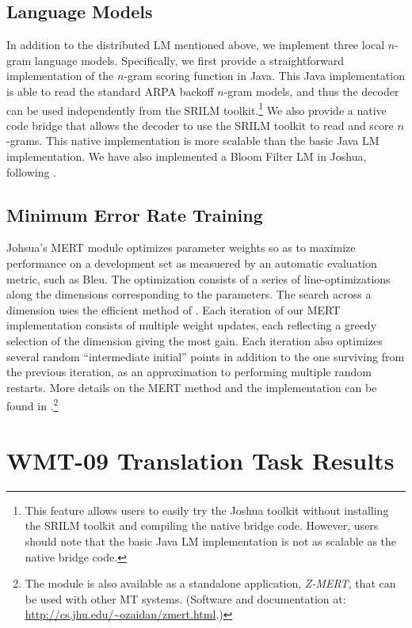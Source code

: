 \documentclass[11pt]{article}
\begin{document}
\subsection{Language Models}
In addition to the distributed LM mentioned above, we implement three local $n$-gram language models. Specifically, we first provide a straightforward implementation of the $n$-gram scoring function in Java. This Java implementation is able to read the standard ARPA backoff $n$-gram models, and thus the decoder can be used independently from the SRILM toolkit.\footnote{This feature allows users to easily try the Joshua toolkit without installing the SRILM toolkit and compiling the native bridge code. However, users should note that the basic Java LM implementation is not as scalable as the native bridge code.} We also provide a native code bridge that allows the decoder to use the SRILM toolkit to read and score $n$-grams. This native implementation is more scalable than the basic Java LM implementation. We have also implemented a Bloom Filter LM in Joshua, following .

\subsection{Minimum Error Rate Training}

Johsua's MERT module optimizes parameter weights so as to maximize performance on a development set as measuered by an automatic evaluation metric, such as Bleu. The optimization consists of a series of line-optimizations along the dimensions corresponding to the parameters. The search across a dimension uses the efficient method of . Each iteration of our MERT implementation consists of multiple weight updates, each reflecting a greedy selection of the dimension giving the most gain. Each iteration also optimizes several random ``intermediate initial'' points in addition to the one surviving from the previous iteration, as an approximation to performing multiple random restarts. More details on the MERT method and the implementation can be found in .\footnote{The module is also available as a standalone application, {\em Z-MERT}, that can be used with other MT systems. (Software and documentation at: \url{http://cs.jhu.edu/~ozaidan/zmert.html}.)}



\section{WMT-09 Translation Task Results}
\end{document}
